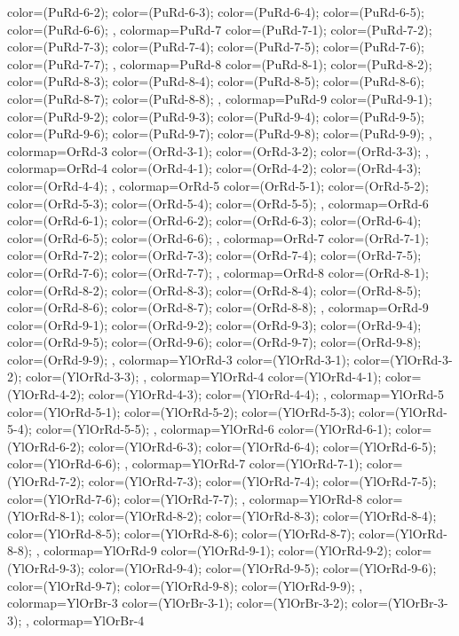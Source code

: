 {{color=(PuRd-6-2);
color=(PuRd-6-3);
color=(PuRd-6-4);
color=(PuRd-6-5);
color=(PuRd-6-6);
},
colormap={PuRd-7}{
color=(PuRd-7-1);
color=(PuRd-7-2);
color=(PuRd-7-3);
color=(PuRd-7-4);
color=(PuRd-7-5);
color=(PuRd-7-6);
color=(PuRd-7-7);
},
colormap={PuRd-8}{
color=(PuRd-8-1);
color=(PuRd-8-2);
color=(PuRd-8-3);
color=(PuRd-8-4);
color=(PuRd-8-5);
color=(PuRd-8-6);
color=(PuRd-8-7);
color=(PuRd-8-8);
},
colormap={PuRd-9}{
color=(PuRd-9-1);
color=(PuRd-9-2);
color=(PuRd-9-3);
color=(PuRd-9-4);
color=(PuRd-9-5);
color=(PuRd-9-6);
color=(PuRd-9-7);
color=(PuRd-9-8);
color=(PuRd-9-9);
},
colormap={OrRd-3}{
color=(OrRd-3-1);
color=(OrRd-3-2);
color=(OrRd-3-3);
},
colormap={OrRd-4}{
color=(OrRd-4-1);
color=(OrRd-4-2);
color=(OrRd-4-3);
color=(OrRd-4-4);
},
colormap={OrRd-5}{
color=(OrRd-5-1);
color=(OrRd-5-2);
color=(OrRd-5-3);
color=(OrRd-5-4);
color=(OrRd-5-5);
},
colormap={OrRd-6}{
color=(OrRd-6-1);
color=(OrRd-6-2);
color=(OrRd-6-3);
color=(OrRd-6-4);
color=(OrRd-6-5);
color=(OrRd-6-6);
},
colormap={OrRd-7}{
color=(OrRd-7-1);
color=(OrRd-7-2);
color=(OrRd-7-3);
color=(OrRd-7-4);
color=(OrRd-7-5);
color=(OrRd-7-6);
color=(OrRd-7-7);
},
colormap={OrRd-8}{
color=(OrRd-8-1);
color=(OrRd-8-2);
color=(OrRd-8-3);
color=(OrRd-8-4);
color=(OrRd-8-5);
color=(OrRd-8-6);
color=(OrRd-8-7);
color=(OrRd-8-8);
},
colormap={OrRd-9}{
color=(OrRd-9-1);
color=(OrRd-9-2);
color=(OrRd-9-3);
color=(OrRd-9-4);
color=(OrRd-9-5);
color=(OrRd-9-6);
color=(OrRd-9-7);
color=(OrRd-9-8);
color=(OrRd-9-9);
},
colormap={YlOrRd-3}{
color=(YlOrRd-3-1);
color=(YlOrRd-3-2);
color=(YlOrRd-3-3);
},
colormap={YlOrRd-4}{
color=(YlOrRd-4-1);
color=(YlOrRd-4-2);
color=(YlOrRd-4-3);
color=(YlOrRd-4-4);
},
colormap={YlOrRd-5}{
color=(YlOrRd-5-1);
color=(YlOrRd-5-2);
color=(YlOrRd-5-3);
color=(YlOrRd-5-4);
color=(YlOrRd-5-5);
},
colormap={YlOrRd-6}{
color=(YlOrRd-6-1);
color=(YlOrRd-6-2);
color=(YlOrRd-6-3);
color=(YlOrRd-6-4);
color=(YlOrRd-6-5);
color=(YlOrRd-6-6);
},
colormap={YlOrRd-7}{
color=(YlOrRd-7-1);
color=(YlOrRd-7-2);
color=(YlOrRd-7-3);
color=(YlOrRd-7-4);
color=(YlOrRd-7-5);
color=(YlOrRd-7-6);
color=(YlOrRd-7-7);
},
colormap={YlOrRd-8}{
color=(YlOrRd-8-1);
color=(YlOrRd-8-2);
color=(YlOrRd-8-3);
color=(YlOrRd-8-4);
color=(YlOrRd-8-5);
color=(YlOrRd-8-6);
color=(YlOrRd-8-7);
color=(YlOrRd-8-8);
},
colormap={YlOrRd-9}{
color=(YlOrRd-9-1);
color=(YlOrRd-9-2);
color=(YlOrRd-9-3);
color=(YlOrRd-9-4);
color=(YlOrRd-9-5);
color=(YlOrRd-9-6);
color=(YlOrRd-9-7);
color=(YlOrRd-9-8);
color=(YlOrRd-9-9);
},
colormap={YlOrBr-3}{
color=(YlOrBr-3-1);
color=(YlOrBr-3-2);
color=(YlOrBr-3-3);
},
colormap={YlOrBr-4}{
}}

